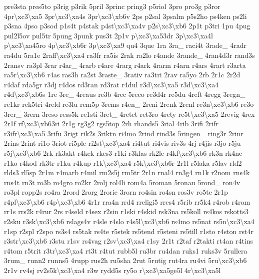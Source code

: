 {pre3sta pres5to p3rig p3rik 5pril 3princ pring3 p5riol 3pro pro3g p3ror 4pr\textbackslash{}xc3\textbackslash{}xa5 3pr\textbackslash{}xc3\textbackslash{}xa4s 3pr\textbackslash{}xc3\textbackslash{}xb6v 2ps p2sal 3psalm p5s2ho ps4ken ps2li p3sna 4pso p3sod p1s4t p4stak p4st\textbackslash{}xc3\textbackslash{}xa4v p2s\textbackslash{}xc3\textbackslash{}xb6 2p1t p3tri 1pu 4pug pul2l5ov pul5tr 5pung 3punk pus3t 2p1v p\textbackslash{}xc3\textbackslash{}xa53dr 3p\textbackslash{}xc3\textbackslash{}xa4l p\textbackslash{}xc3\textbackslash{}xa45ro 4p\textbackslash{}xc3\textbackslash{}xb6r 3p\textbackslash{}xc3\textbackslash{}xa9 qu4 3que 1ra 3ra\-\_\- raci4t 3rade\-\_\- 4radr ra4du 5ra1e 2raff\textbackslash{}xc3\textbackslash{}xa4 ra3fr ra5is 2rak ra2lo r4ande 3rande\-\_\- 4ran4d3r rand3s 2ransv ra3pl 3rar r4ar\-\_\- 4rarb r4are 4rarg r4ark 4rarm r4arn r4ars 4rart r3arta ra5r\textbackslash{}xc3\textbackslash{}xb6 r4as ras3h ra2st 3raste\-\_\- 3rativ ra3tri 2rav ra5yo 2rb 2r1c 2r2d r4daf rda5gr r3dj r4dos rd3ran rd3rat r4dul r3d\textbackslash{}xc3\textbackslash{}xa5 r3d\textbackslash{}xc3\textbackslash{}xa4 r4d\textbackslash{}xc3\textbackslash{}xb6s 1re 3re\-\_\- 4reaus re3b 4rec 5reco re3d4r re5du 4reft 4regg 3regn\-\_\- re1kr rek5tri 4reld re3lu rem5p 3rems r4en\-\_\- 2reni 2renk 2renl re3n\textbackslash{}xc3\textbackslash{}xb6 re3o 3rer\-\_\- 3rern 3reso ress5k re1sti 3ret\-\_\- 4retet ret3ro 4rety re5t\textbackslash{}xc3\textbackslash{}xa5 2revig 4rex 2r1f rf\textbackslash{}xc3\textbackslash{}xb63ri 2r1g rg3g2 rgs5top 2rh rhands5 3rial 4rib 3rifi 2rifr r3ifr\textbackslash{}xc3\textbackslash{}xa5 3rifu 3rigt rik2s 3riktn ri4mo 2rind rind3s 5ringen\-\_\- ring3r 2rinr 2rins 2rint ri1o 3riot ri5ple ri2st\textbackslash{}xc3\textbackslash{}xa4 ri4tut ri4vis riv3s 4rj r4jis r3jo r5ju r5j\textbackslash{}xc3\textbackslash{}xb6 2rk rk3akt r4kek rkes3 r1ki r3klas rk2le r4kl\textbackslash{}xc3\textbackslash{}xb6 rk3n rk4ne r1ko r4kod rk3tr r1ku r4kup r1k\textbackslash{}xc3\textbackslash{}xa4 r5k\textbackslash{}xc3\textbackslash{}xb6r 2r1l r5laka r5lav rld2 rlds3 rl5sp 2r1m r4marb r4mil rm2s5j rm5tr 2r1n rnal4 rn3g4 rn1k r2nom rns4k rns4t rn3t ro3b ro4gro ro2kr 2rolj rol4li rom4a 5roman 5ronau 5rond\-\_\- ron4v ro3pl ropp2s ro4ra 2rord 2rorg 2rorie 3rorn ro4sin ro4sn ros3v ro5te 2r1p r4pl\textbackslash{}xc3\textbackslash{}xb6 r4p\textbackslash{}xc3\textbackslash{}xb6 4r1r rra4n rrd4 rreligi5 rres4 r5rib rr5k4 r4rob r4rom rr1s rrs2k r4rur 2rs r4seld r4sex r2sin r1ski r4skid rsk3na rs5koll rs4kos rskotts3 r2sku r3sk\textbackslash{}xc3\textbackslash{}xb6 rslags4v r4sle r4slo r4s5l\textbackslash{}xc3\textbackslash{}xb6 rs4mo rs5nat rs5n\textbackslash{}xc3\textbackslash{}xa4 r1sp r2spl r2spo rs3s4 rs5tak rs4te r5stek rs5tend r5steni rs5till r1sto r4ston rst4r r3str\textbackslash{}xc3\textbackslash{}xb6 r3stu r1sv rs4vag r2sv\textbackslash{}xc3\textbackslash{}xa4 r1sy 2r1t r2taf r2takti rt4an r4tins r4tom r5trit r3tr\textbackslash{}xc3\textbackslash{}xa4 rt3t r4tut rubb5l ru3br ru4dan ruks1 ruks3v 5rullera 3rum\-\_\- runn2 runns5 4rupp rus2h ru5sha 2rut 5rutig rut4ra ru4vi 5ru\textbackslash{}xc3\textbackslash{}xb6 2r1v rv4sj rv2s5k\textbackslash{}xc3\textbackslash{}xa4 r3w rydd5s ry5o r\textbackslash{}xc3\textbackslash{}xa5ge5l 4r\textbackslash{}xc3\textbackslash{}xa5l }
